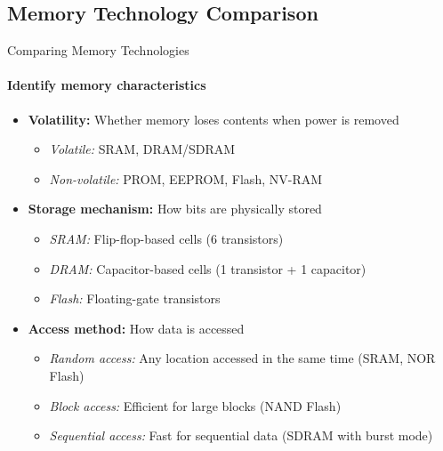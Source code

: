 \subsection{Memory Technology Comparison}

\begin{KR}{Comparing Memory Technologies}
\paragraph{Identify memory characteristics}
\begin{itemize}
    \item \textbf{Volatility:} Whether memory loses contents when power is removed
    \begin{itemize}
        \item \textit{Volatile:} SRAM, DRAM/SDRAM
        \item \textit{Non-volatile:} PROM, EEPROM, Flash, NV-RAM
    \end{itemize}
    \item \textbf{Storage mechanism:} How bits are physically stored
    \begin{itemize}
        \item \textit{SRAM:} Flip-flop-based cells (6 transistors)
        \item \textit{DRAM:} Capacitor-based cells (1 transistor + 1 capacitor)
        \item \textit{Flash:} Floating-gate transistors
    \end{itemize}
    \item \textbf{Access method:} How data is accessed
    \begin{itemize}
        \item \textit{Random access:} Any location accessed in the same time (SRAM, NOR Flash)
        \item \textit{Block access:} Efficient for large blocks (NAND Flash)
        \item \textit{Sequential access:} Fast for sequential data (SDRAM with burst mode)
    \end{itemize}
\end{itemize}


\end{KR}
